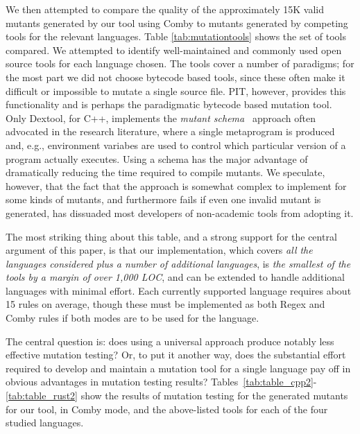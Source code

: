 \documentclass[acmsmall]{acmart}
\begin{document}
{ We then attempted to compare the quality of the approximately 15K
 valid mutants generated by our tool using Comby to mutants generated
 by competing tools for the relevant languages.
Table \ref{tab:mutationtools} shows the set of tools compared.  We
attempted to identify well-maintained and commonly used open
source tools for each
language chosen.  The tools cover a number of paradigms; for the most
part we did not choose bytecode based tools, since these often make it
difficult or impossible to mutate a single source file.  PIT, however,
provides this functionality and is perhaps the paradigmatic bytecode
based mutation tool.  Only Dextool, for C++, implements the
\emph{mutant schema}~\cite{untch1993mutation} approach often advocated
in the research literature, where a single metaprogram is produced
and, e.g., environment variabes are used to control which particular
version of a program actually executes.  Using a schema has the major
advantage of dramatically reducing the time required to compile
mutants.  We speculate, however, that the fact that the approach is
somewhat complex to implement for some kinds of mutants, and
furthermore fails if even one invalid mutant is generated, has
dissuaded most developers of non-academic tools from adopting it.

The most striking thing about this table, and a strong support for
the central argument of this paper, is that our implementation, which
covers \emph{all the languages considered plus a number of additional
languages}, is \emph{the smallest of the tools by a margin of over 1,000 LOC},
and can be extended to handle additional languages with minimal
effort.  Each currently supported language requires about 15 rules on
average, though these must be implemented as both Regex and Comby
rules if both modes are to be used for the language.

The central question is: does using a universal approach produce
notably less effective mutation testing?  Or, to put it another way,
does the substantial effort required to develop and maintain a
mutation tool for a single language pay off in obvious advantages in
mutation testing results?
Tables~\ref{tab:table_cpp2}-\ref{tab:table_rust2} show the results of
mutation testing for the generated mutants for our tool, in Comby mode, and the above-listed tools for each of the four
studied languages.  

}
\end{document}

